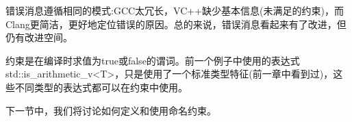 错误消息遵循相同的模式:GCC太冗长，VC++缺少基本信息(未满足的约束)，而Clang更简洁，更好地定位错误的原因。总的来说，错误消息看起来有了改进，但仍有改进空间。

约束是在编译时求值为true或false的谓词。前一个例子中使用的表达式std::is\_arithmetic\_v<T>，只是使用了一个标准类型特征(前一章中看到过)，这些不同类型的表达式都可以在约束中使用。

下一节中，我们将讨论如何定义和使用命名约束。
























